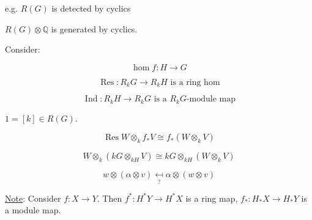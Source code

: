 \documentclass{article}
\theoremstyle{definition}
\begin{document}
e.g. \(R(G)\) is detected by cyclics

\(R(G) \otimes \mathbb{Q}\) is generated by cyclics.

Consider:

\[
    \operatorname{hom} f: H \to G
\]

\[
    \operatorname{Res}: R_k G \to R_k H \text{ is a ring hom} 
\]

\[
    \operatorname{Ind}: R_k H \to R_k G \text{ is a \(R_kG\)-module map} 
\]

\(1 = [k] \in R(G)\).

\[
    \operatorname{Res} W \otimes_k f_{\ast} V \cong f_{\ast} (W \otimes_k V)
\]

\[
    W \otimes_k (kG \otimes_{kH} V) \cong kG \otimes_{kH} (W \otimes_k V)
\]

\[
    w \otimes (\alpha \otimes v) \underset{?}{\mapsfrom} \alpha \otimes (w \otimes v)
\]

\underline{Note}: Consider \(f: X \to Y\). Then \(f^{\ast} : H ^{\ast} Y \to H^{\ast} X\) is a ring map, \(f_{\ast}: H_{\ast} X \to H_{\ast} Y\) is a module map.
\end{document}
